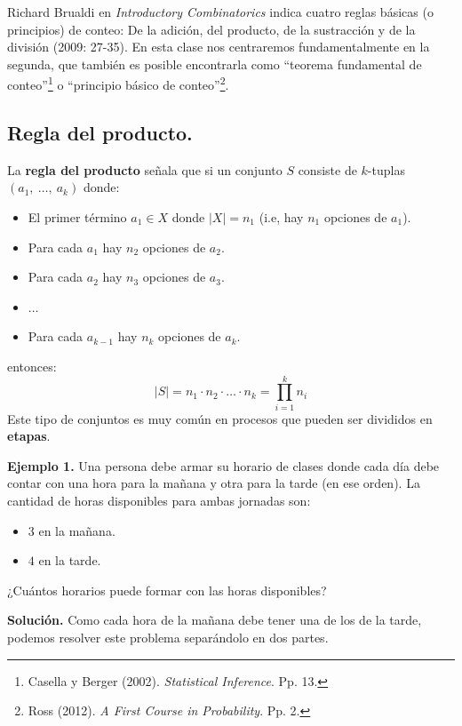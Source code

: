 \documentclass[12pt]{article}
\begin{document}
Richard Brualdi en \textit{Introductory Combinatorics} indica cuatro reglas básicas (o principios) de conteo: De la adición, del producto, de la sustracción y de la división (2009: 27-35). En esta clase nos centraremos fundamentalmente en la segunda, que también es posible encontrarla como ``teorema fundamental de conteo''\footnote{Casella y Berger (2002). \textit{Statistical Inference}. Pp. 13.} o ``principio básico de conteo''\footnote{Ross (2012). \textit{A First Course in Probability}. Pp. 2.}.

\subsection{Regla del producto.}

La \textbf{regla del producto} señala que si un conjunto $S$ consiste de $k$-tuplas $(a_{1}, \ \ldots, \ a_{k})$ donde:

\begin{itemize}
\item El primer término $a_{1} \in X$ donde $|X| = n_{1}$ (i.e, hay $n_{1}$ opciones de $a_{1}$).
\item Para cada $a_{1}$ hay $n_{2}$ opciones de $a_{2}$.
\item Para cada $a_{2}$ hay $n_{3}$ opciones de $a_{3}$.
\item $\ldots$
\item Para cada $a_{k - 1}$ hay $n_{k}$ opciones de $a_{k}$.
\end{itemize}

entonces:
\[
  |S| = n_{1} \cdot n_{2} \cdot \ldots \cdot n_{k} = \prod_{i = 1}^{k} n_{i}
\]
Este tipo de conjuntos es muy común en procesos que pueden ser divididos en \textbf{etapas}.

\textbf{Ejemplo 1.} Una persona debe armar su horario de clases donde cada día debe contar con una hora para la mañana y otra para la tarde (en ese orden). La cantidad de horas disponibles para ambas jornadas son:

\begin{itemize}
\item $3$ en la mañana.
\item $4$ en la tarde.
\end{itemize}

¿Cuántos horarios puede formar con las horas disponibles?

\textbf{Solución.} Como cada hora de la mañana debe tener una de los de la tarde, podemos resolver este problema separándolo en dos partes.
\end{document}
